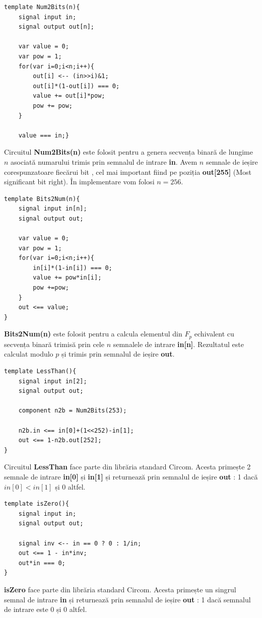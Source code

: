 \documentclass[12pt, letterpaper]{article}
\begin{document}
\begin{lstlisting}[caption="Num2Bits.circom"]
template Num2Bits(n){
    signal input in;
    signal output out[n];

    var value = 0;
    var pow = 1;
    for(var i=0;i<n;i++){
        out[i] <-- (in>>i)&1;
        out[i]*(1-out[i]) === 0;
        value += out[i]*pow;
        pow += pow;
    }

    value === in;}
\end{lstlisting}

Circuitul \textbf{Num2Bits(n)} este folosit pentru a genera secvența binară  de lungime $n$ asociată numarului trimis prin semnalul de intrare \textbf{in}. Avem $n$ semnale de ieșire corespunzatoare fiecărui bit , cel mai important fiind pe poziția \textbf{out[255]} (Most significant bit right). În implementare vom folosi $n=256$.

\begin{lstlisting}[caption="Bits2Num.circom"]
template Bits2Num(n){
    signal input in[n];
    signal output out;

    var value = 0;
    var pow = 1;
    for(var i=0;i<n;i++){
        in[i]*(1-in[i]) === 0;
        value += pow*in[i];
        pow +=pow;
    }
    out <== value;
}
\end{lstlisting}

\textbf{Bits2Num(n)} este folosit pentru a calcula elementul din $F_p$ echivalent cu secvența binară trimisă prin cele $n$ semnalele de intrare \textbf{in[n]}.
Rezultatul este calculat modulo $p$ și trimis prin semnalul de ieșire \textbf{out}.

\begin{lstlisting}[caption="LessThan"]
template LessThan(){
    signal input in[2];
    signal output out;

    component n2b = Num2Bits(253);

    n2b.in <== in[0]+(1<<252)-in[1];
    out <== 1-n2b.out[252];
}
\end{lstlisting}

Circuitul \textbf{LessThan} face parte din librăria standard Circom. Acesta primește 2 semnale de intrare \textbf{in[0]} și \textbf{in[1]} și returnează prin semnalul de ieșire \textbf{out} : 1 dacă $in[0]<in[1]$ și 0 altfel.

\begin{lstlisting}[caption="isZero.circom"]
template isZero(){
    signal input in;
    signal output out;

    signal inv <-- in == 0 ? 0 : 1/in;
    out <== 1 - in*inv;
    out*in === 0;
}
\end{lstlisting}
\textbf{isZero} face parte din librăria standard Circom. Acesta primește un singrul semnal de intrare \textbf{in} și returnează prin semnalul de ieșire \textbf{out} : 1 dacă semnalul de intrare este 0 și 0 altfel.
\end{document}
